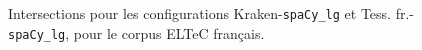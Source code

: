 \begin{figure}[h!]
\caption{Intersections pour les configurations Kraken-\texttt{spaCy\_lg} et Tess. fr.-\texttt{spaCy\_lg}, pour le corpus ELTeC français.}
\label{fig:intersection_globale-kraken-tess}
\end{figure}


